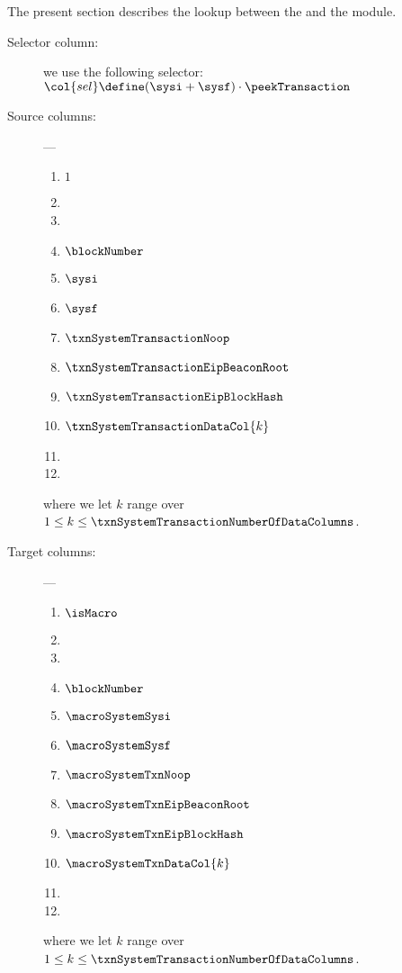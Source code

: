 The present section describes the lookup between the \hubMod{} and the \userTxnDataMod{} module.
\begin{description}
	\item[Selector column:] we use the following selector: $\col{sel} \define (\sysi + \sysf) \cdot \peekTransaction$
	\item[Source columns:] ---
		\begin{multicols}{4}
			\begin{enumerate}
				\item $1$
				\item[\vspace{\fill}]
				\item[\vspace{\fill}]
				\item $\blockNumber$
				\item $\sysi$
				\item $\sysf$
				\item $\txnSystemTransactionNoop$
				\item $\txnSystemTransactionEipBeaconRoot$
				\item $\txnSystemTransactionEipBlockHash$
				\item $\txnSystemTransactionDataCol{k}$
				\item[\vspace{\fill}]
				\item[\vspace{\fill}]
			\end{enumerate}
		\end{multicols}
		where we let $k$ range over $1 \leq k \leq \txnSystemTransactionNumberOfDataColumns$.
	\item[Target columns:] ---
		\begin{multicols}{4}
			\begin{enumerate}
				\item $\isMacro$
				\item[\vspace{\fill}]
				\item[\vspace{\fill}]
				\item $\blockNumber$
				\item $\macroSystemSysi$
				\item $\macroSystemSysf$
				\item $\macroSystemTxnNoop$
				\item $\macroSystemTxnEipBeaconRoot$
				\item $\macroSystemTxnEipBlockHash$
				\item $\macroSystemTxnDataCol{k}$
				\item[\vspace{\fill}]
				\item[\vspace{\fill}]
			\end{enumerate}
		\end{multicols}
		where we let $k$ range over $1 \leq k \leq \txnSystemTransactionNumberOfDataColumns$.
\end{description}
